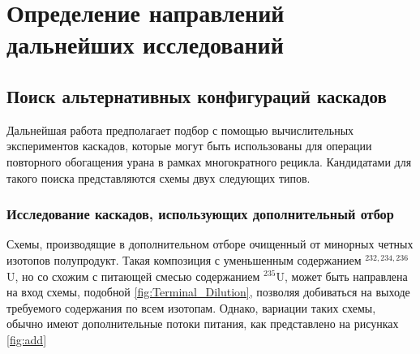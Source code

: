 \chapter{Определение направлений дальнейших исследований}\label{ch:ch2}

\section{Поиск альтернативных конфигураций каскадов}\label{sec:ch2/sec2}
Дальнейшая работа предполагает подбор с помощью вычислительных экспериментов каскадов, которые могут быть использованы для операции повторного обогащения урана в рамках многократного рецикла. Кандидатами для такого поиска представляются схемы двух следующих типов.

\subsection{Исследование каскадов, использующих дополнительный отбор}\label{sec:ch2/sec1.2}
Схемы, производящие в дополнительном отборе очищенный от минорных четных изотопов полупродукт. Такая композиция с уменьшенным содержанием $^{232, 234, 236}$U, но со схожим с питающей смесью содержанием $^{235}$U, может быть направлена на вход схемы, подобной \ref{fig:Terminal_Dilution}, позволяя добиваться на выходе требуемого содержания по всем изотопам. Однако,  вариации таких схемы, обычно имеют дополнительные потоки питания, как представлено на рисунках \ref{fig:add}

